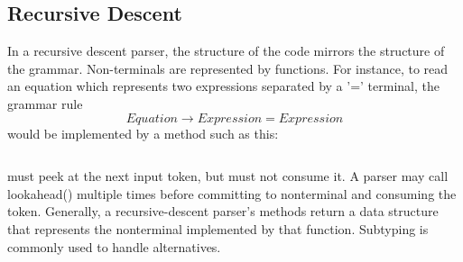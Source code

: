 \subsection{Recursive Descent}

In a recursive descent parser, the structure of the code mirrors the structure of the grammar.
Non-terminals are represented by functions.
For instance, to read an equation which represents two expressions separated by a '=' terminal,
the grammar rule
\[
    Equation \rightarrow Expression = Expression
\]
would be implemented by a method such as this:

\inputminted[fontsize=\footnotesize,linenos=true]{python}{code/parseEquation.java}

 must peek at the next input token, but must not consume it.
A parser may call lookahead() multiple times before committing to nonterminal and
consuming the token.
Generally, a recursive-descent parser's methods return a data structure that represents the
nonterminal implemented by that function.  Subtyping is commonly used to handle alternatives.

